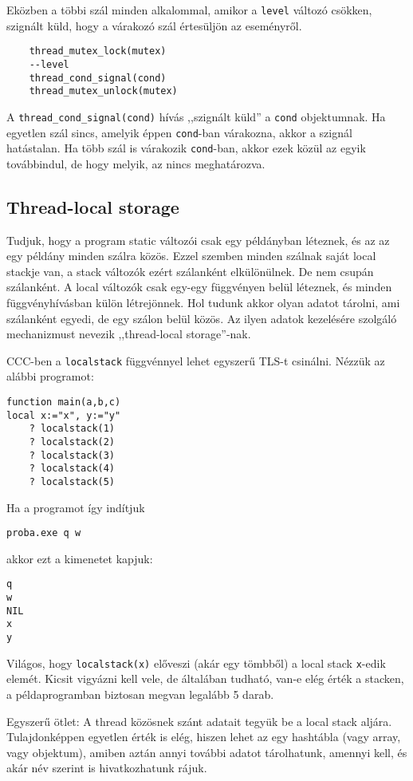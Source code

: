 Eközben a többi szál minden alkalommal, 
amikor a \verb!level! változó csökken, szignált küld,
hogy a várakozó szál értesüljön az eseményről.
\begin{verbatim}
    thread_mutex_lock(mutex)
    --level
    thread_cond_signal(cond)
    thread_mutex_unlock(mutex)
\end{verbatim}
A \verb!thread_cond_signal(cond)! hívás ,,szignált küld'' a \verb!cond!
objektumnak. Ha egyetlen szál sincs, amelyik éppen  \verb!cond!-ban várakozna,
akkor a szignál hatástalan. Ha több szál is várakozik \verb!cond!-ban,
akkor ezek közül az egyik továbbindul, de hogy melyik, az nincs meghatározva.





\subsection{Thread-local storage}

Tudjuk, 
hogy a program static változói csak egy példányban léteznek,
és az az egy példány minden szálra közös. 
Ezzel szemben minden szálnak saját local stackje van, 
a stack változók ezért szálanként elkülönülnek.
De nem csupán szálanként.
A local változók csak egy-egy függvényen belül léteznek,
és minden függvényhívásban külön létrejönnek.
Hol tudunk akkor olyan adatot tárolni, ami szálanként egyedi,
de egy szálon belül közös.  Az ilyen adatok kezelésére szolgáló 
mechanizmust nevezik ,,thread-local storage''-nak.

CCC-ben a \verb!localstack! függvénnyel lehet egyszerű TLS-t csinálni.
Nézzük az alábbi programot:
\begin{verbatim}
function main(a,b,c)
local x:="x", y:="y"
    ? localstack(1)
    ? localstack(2)
    ? localstack(3)
    ? localstack(4)
    ? localstack(5)
\end{verbatim}
Ha a programot így indítjuk
\begin{verbatim}
proba.exe q w
\end{verbatim}
akkor ezt a kimenetet kapjuk:
\begin{verbatim}
q
w
NIL
x
y
\end{verbatim}
Világos, hogy \verb!localstack(x)! előveszi (akár egy tömbből) 
a local stack \verb!x!-edik elemét. Kicsit vigyázni kell vele,
de általában tudható, van-e elég érték a stacken, a példaprogramban
biztosan megvan legalább 5 darab.

Egyszerű ötlet: A thread közösnek szánt adatait tegyük be
a local stack aljára. Tulajdonképpen egyetlen érték is elég,
hiszen lehet az egy  hashtábla (vagy array, vagy objektum), 
amiben aztán annyi további adatot tárolhatunk, amennyi kell, 
és akár név szerint is hivatkozhatunk rájuk.


